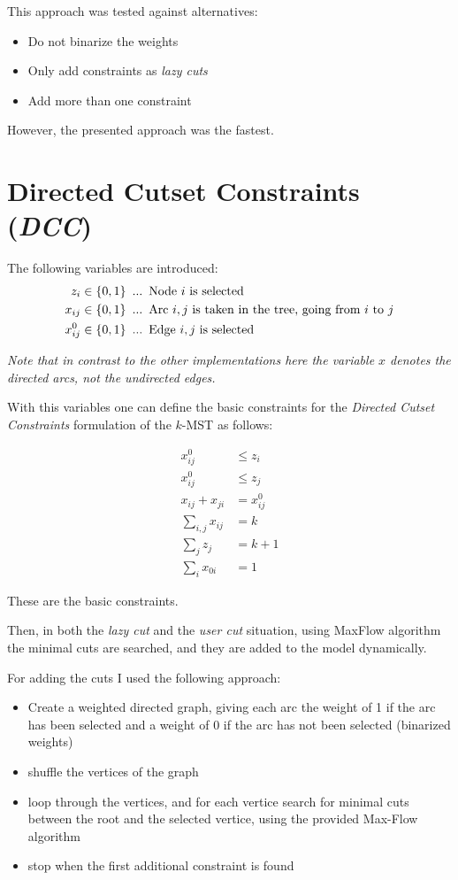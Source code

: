 \documentclass[11pt, oneside, a4paper, fleqn]{article}
\begin{document}
This approach was tested against alternatives:
\begin{itemize}
\item Do not binarize the weights
\item Only add constraints as \emph{lazy cuts}
\item Add more than one constraint
\end{itemize}

However, the presented approach was the fastest.

\section*{Directed Cutset Constraints (\emph{DCC})}

The following variables are introduced:
\begin{align*}
  z_i \in\{0,1\} & \enskip ... \enskip \text{Node $i$ is selected}\\
  x_{ij} \in\{0,1\} & \enskip ... \enskip\text{Arc $i,j$ is taken
             in the tree, going from $i$ to $j$}\\
  x^0_{ij} \in\{0,1\} & \enskip ... \enskip\text{Edge $i,j$ is selected}
\end{align*}

\emph{
Note that in contrast to the other implementations here the
variable $x$ denotes the directed arcs, not the undirected edges.
}

With this variables one can define the basic constraints for
the \emph{Directed Cutset Constraints} formulation of
the $k$-MST as follows:

\begin{align}
  x^0_{ij} & \le z_i \\
  x^0_{ij} & \le z_j \\
  x_{ij} + x_{ji} & = x^0_{ij}\\
  \sum_{i,j}x_{ij} & = k \\
  \sum_{j} z_j & = k + 1 \\
  \sum_{i} x_{0i} & = 1
\end{align}

These are the basic constraints.

Then, in both the \emph{lazy cut} and the \emph{user cut}
situation, using MaxFlow algorithm the minimal cuts are
searched, and they are added to the model dynamically.

For adding the cuts I used the following approach:
\begin{itemize}
\item Create a weighted directed graph, giving each arc
the weight of 1 if the arc has been selected and a weight of 0
if the arc has not been selected (binarized weights)
\item shuffle the vertices of the graph
\item loop through the vertices, and for each vertice
search for minimal cuts between the root and the selected vertice,
using the provided Max-Flow algorithm
\item stop when the first additional constraint is found
\end{itemize}
\end{document}
